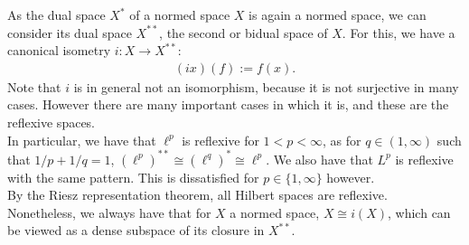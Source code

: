 \documentclass{tikzposter} %
\begin{document}
\begin{columns}
{      As the dual space $X^{*}$ of a normed space $X$ is again a normed space, we can consider its dual space $X^{**}$, the second or bidual space of $X$. For this, we have a canonical isometry $i : X \to X^{**}$:
      \begin{align*}
        (ix)(f) := f(x).
      \end{align*}
      Note that $i$ is in general not an isomorphism, because it is not surjective in many cases. However there are many important cases in which it is, and these are the reflexive spaces. \\

      In particular, we have that $\ell^{p}$ is reflexive for $1 < p < \infty$, as for $q \in (1,\infty)$ such that $1/p+1/q = 1$, $(\ell^{p})^{**} \cong (\ell^{q})^{*} \cong \ell^{p}$. We also have that $L^{p}$ is reflexive with the same pattern. This is dissatisfied for $p \in \{1,\infty\}$ however. \\

      By the Riesz representation theorem, all Hilbert spaces are reflexive. \\

      Nonetheless, we always have that for $X$ a normed space, $X \cong i(X)$, which can be viewed as a dense subspace of its closure in $X^{**}$.








  }

\end{columns}
\end{document}
